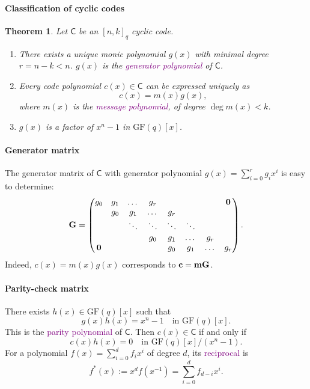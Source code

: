 \documentclass[a4paper, 11pt, openany]{book}
\numberwithin{equation}{section}
\theoremstyle{plain}
\newtheorem{theorem}	[equation]	{Theorem}
\theoremstyle{definition}
\newcommand{\GF}{\mathrm{GF}}
\newcommand{\Define}[1]{\textcolor{purple}{#1}}
\newcommand{\code}[1]{\mathsf{#1}}
\begin{document}
\paragraph{Classification of cyclic codes}
\begin{theorem} 
Let $\code{C}$ be an $[n,k]_q$ cyclic code.
\begin{enumerate}
	\item There exists a unique monic polynomial $g(x)$ with minimal degree $r = n-k < n$. $g(x)$ is the \Define{generator polynomial} of $\code{C}$.
	
	\item Every code polynomial $c(x) \in \code{C}$ can be expressed uniquely as 
	\[
		c(x) = m(x) g(x),
	\]
	where $m(x)$ is the \Define{message polynomial}, of degree $\deg m(x) < k$.
	
	\item $g(x)$ is a factor of $x^n - 1$ in $\GF(q)[x]$.
\end{enumerate}
\end{theorem}


\paragraph{Generator matrix}
The generator matrix of $\code{C}$ with generator polynomial $g(x) = \sum_{i=0}^r g_i x^i$ is easy to determine:
\[
	{\bf G} = \begin{pmatrix}
	g_0		& g_1	& \dots 	& g_r 		& 			& 			& 		& {\bf 0}\\
			& g_0	& g_1 		& \dots 	& g_r 		& 			& 		& \\
			&    	& \ddots 	& \ddots 	& \ddots 	& \ddots 	& 		& \\
			& 		& 			& g_0		& g_1		& \dots		& g_r	& \\
	{\bf 0}	& 		& 			&			& g_0		& g_1		& \dots	& g_r 
	\end{pmatrix}.
\]
Indeed, $c(x) = m(x) g(x)$ corresponds to ${\bf c} = {\bf m} {\bf G}$.




\paragraph{Parity-check matrix}
There exists $h(x) \in \GF(q)[x]$ such that
\[
	g(x)h(x) = x^n - 1 \quad \text{in } \GF(q)[x].
\]
This is the \Define{parity polynomial} of $\code{C}$. Then $c(x) \in \code{C}$ if and only if
\[	c(x) h(x) = 0 \quad \text{in } \GF(q)[x] / (x^n - 1).
\]
For a polynomial $f(x) = \sum_{i=0}^d f_i x^i$ of degree $d$, its \Define{reciprocal} is
\[
	f^*(x) := x^d f(x^{-1}) = \sum_{i=0}^d f_{d-i} x^i.
\]
\end{document}
